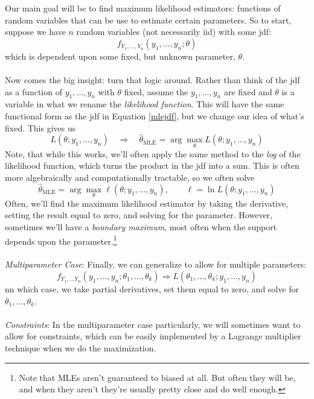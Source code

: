 \documentclass[a4paper,12pt]{scrartcl}
\begin{document}
Our main goal will be to find maximum likelihood estimators: functions
of random variables that can be use to estimate certain parameters.
So to start, suppose we have $n$ random variables (not necessarily
iid) with some jdf:
\begin{equation}
   \label{mlejdf}
    f_{Y_1, \ldots, Y_n}(y_1, \ldots, y_n; \theta)
\end{equation}
which is dependent upon some fixed, but unknown parameter, $\theta$.
\\
\\
Now comes the big insight: turn that logic around. Rather than think
of the jdf as a function of $y_1, \ldots, y_n$ with $\theta$ fixed,
assume the $y_1, \ldots, y_n$ are fixed and $\theta$ is a variable
in what we rename the \emph{likelihood function}.
This will have the same functional form as the jdf in Equation
\ref{mlejdf}, but we change our idea of what's fixed. This gives us
\begin{equation}
   \label{mlelik}
    L(\theta; y_1, \ldots, y_n) \quad\Rightarrow \quad
    \hat{\theta}_{\text{MLE}} =
   \arg \max_\theta L(\theta; y_1, \ldots, y_n)
\end{equation}
Note, that while this works, we'll often apply the same method to
the \emph{log} of the likelihood function, which turns the product
in the jdf into a sum. This is often more algebraically and
computationally tractable, so we often solve
\[ \hat{\theta}_{\text{MLE}}  =
   \arg \max_\theta \ell(\theta; y_1, \ldots, y_n),
   \qquad \ell = \ln L(\theta; y_1, \ldots, y_n)  \]
Often, we'll find the maximum likelihood estimator by taking the
derivative, setting the result equal to zero, and solving for the
parameter. However, sometimes we'll have a \emph{boundary maximum},
most often when the support depends upon the parameter.\footnote{
Note that MLEs aren't guaranteed to biased at all. But often they will
be, and when they aren't they're usually pretty close and do
well enough.}
\\
\\
{\sl Multiparameter Case}: Finally, we can generalize to
allow for multiple parameters:
   \[ f_{Y_1, \ldots Y_n}(y_1, \ldots, y_n; \theta_1, \ldots, \theta_k)
      \Rightarrow
      L(\theta_1, \ldots, \theta_k; y_1, \ldots, y_n )
      \]
nn which case, we take partial derivatives, set them equal to zero,
and solve for $\theta_1, \ldots, \theta_k$.
\\
\\
{\sl Constraints}: In the multiparameter case particularly, we will
sometimes want to allow for constraints, which can be easily
implemented by a Lagrange multiplier technique when we do the
maximization.
\end{document}
